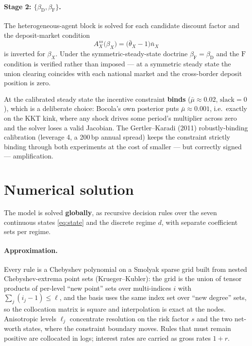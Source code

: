 \documentclass[11pt]{article}
\numberwithin{equation}{section}
\newcommand{\D}{\mathrm{D}}
\newcommand{\F}{\mathrm{F}}
\theoremstyle{definition}
\theoremstyle{plain}
\theoremstyle{remark}
\begin{document}
\paragraph{\texorpdfstring{Stage 2: $\{\beta_\D,\beta_\F\}$.}
                          {Stage 2.}} The heterogeneous-agent block is solved
for each candidate discount factor and the deposit-market condition
\begin{equation}
A^{ss}_X\bigl(\beta_X\bigr)=\bigl(\bar\theta_X-1\bigr)\bar n_X
\label{eq:ss-deposit}
\end{equation}
is inverted for $\beta_X$. Under the symmetric-steady-state doctrine
$\beta_\F=\beta_\D$ and the $\F$ condition is verified rather than imposed --- at a
symmetric steady state the union clearing coincides with each national market and the
cross-border deposit position is zero.

At the calibrated steady state the incentive constraint \textbf{binds}
($\bar\mu\approx0.02$, $\mathrm{slack}=0$), which is a deliberate choice: Bocola's own
posterior puts $\bar\mu\approx0.001$, i.e.\ exactly on the KKT kink, where any shock
drives some period's multiplier across zero and the solver loses a valid Jacobian.
The Gertler--Karadi (2011) robustly-binding calibration (leverage 4, a 200\,bp annual
spread) keeps the constraint strictly binding through both experiments at the cost of
smaller --- but correctly signed --- amplification.

\section{Numerical solution}

The model is solved \textbf{globally}, as recursive decision rules over the seven
continuous states \eqref{eq:state} and the discrete regime $d$, with separate
coefficient sets per regime.

\paragraph{Approximation.} Every rule is a Chebyshev polynomial on a Smolyak sparse
grid built from nested Chebyshev-extrema point sets (Krueger--Kubler): the grid is
the union of tensor products of per-level ``new point'' sets over multi-indices $i$
with $\sum_j(i_j-1)\le\ell$, and the basis uses the same index set over ``new
degree'' sets, so the collocation matrix is square and interpolation is exact at the
nodes. Anisotropic levels $\ell_j$ concentrate resolution on the risk factor $s$ and
the two net-worth states, where the constraint boundary moves. Rules that must remain
positive are collocated in logs; interest rates are carried as gross rates $1+r$.
\end{document}
